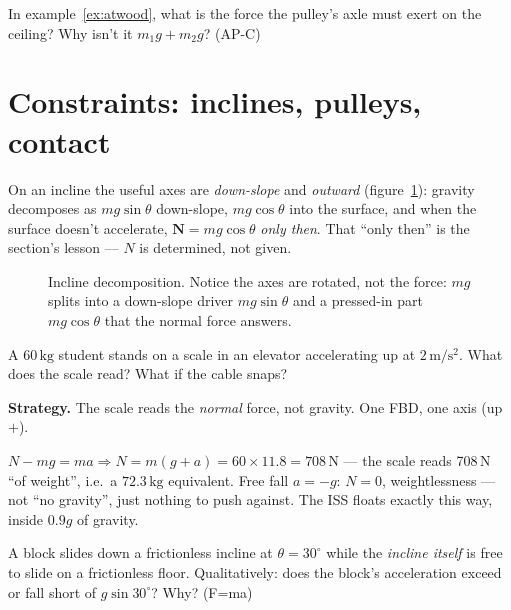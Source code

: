 \begin{exercise}[easy]
In example~\ref{ex:atwood}, what is the force the pulley's axle must exert
on the ceiling? Why isn't it $m_1g+m_2g$? (AP-C)
\end{exercise}

\section{Constraints: inclines, pulleys, contact}\label{sec:new-incline}

On an incline the useful axes are \emph{down-slope} and \emph{outward}
(figure~\ref{fig:incline}): gravity decomposes as $mg\sin\theta$ down-slope,
$mg\cos\theta$ into the surface, and when the surface doesn't accelerate,
$\mathbf N=mg\cos\theta$ \emph{only then}. That ``only then'' is the
section's lesson --- $N$ is determined, not given.

\begin{figure}[htbp]\centering

\caption{Incline decomposition. Notice the axes are rotated, not the force:
$mg$ splits into a down-slope driver $mg\sin\theta$ and a pressed-in part
$mg\cos\theta$ that the normal force answers.}
\label{fig:incline}
\end{figure}

\begin{example}\label{ex:apparent}
A $60\,\mathrm{kg}$ student stands on a scale in an elevator accelerating
up at $2\,\mathrm{m/s^{2}}$. What does the scale read? What if the cable
snaps?
\par\smallskip
\textbf{Strategy.} The scale reads the \emph{normal} force, not gravity.
One FBD, one axis (up $+$).
\begin{solution}
$N-mg=ma \Rightarrow N=m(g+a)=60\times11.8=708\,\mathrm{N}$ --- the scale
reads 708\,N ``of weight'', i.e.\ a $72.3\,\mathrm{kg}$ equivalent.
Free fall $a=-g$: $N=0$, weightlessness --- not ``no gravity'', just
nothing to push against. The ISS floats exactly this way, inside $0.9g$ of
gravity. \checkmark
\end{solution}
\end{example}

\begin{exercise}[medium]
A block slides down a frictionless incline at $\theta=30^{\circ}$ while the
\emph{incline itself} is free to slide on a frictionless floor. Qualitatively:
does the block's acceleration exceed or fall short of $g\sin30^{\circ}$?
Why? (F=ma)
\end{exercise}

